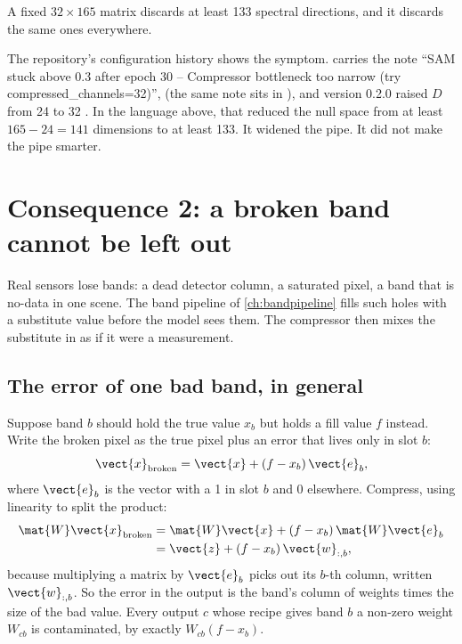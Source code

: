 \begin{keypoint}
A fixed $32\times165$ matrix discards at least 133 spectral directions, and it discards the same ones everywhere.
\end{keypoint}

{\sloppy The repository's configuration history shows the symptom.  carries the note ``SAM stuck above 0.3 after epoch 30 -- Compressor bottleneck too narrow (try compressed\_channels=32)'', (the same note sits in ), and version 0.2.0 raised $D$ from 24 to 32 . In the language above, that reduced the null space from at least $165 - 24 = 141$ dimensions to at least 133. It widened the pipe. It did not make the pipe smarter.\par}

\section{Consequence 2: a broken band cannot be left out}\label{sec:ceiling:dead}

Real sensors lose bands: a dead detector column, a saturated pixel, a band that is no-data in one scene. The band pipeline of \cref{ch:bandpipeline} fills such holes with a substitute value before the model sees them. The compressor then mixes the substitute in as if it were a measurement.

\subsection{The error of one bad band, in general}

Suppose band $b$ should hold the true value $x_b$ but holds a fill value $f$ instead. Write the broken pixel as the true pixel plus an error that lives only in slot $b$:
\begin{equation*}
  \vect{x}_{\text{broken}} = \vect{x} + (f - x_b)\,\vect{e}_b,
\end{equation*}
where $\vect{e}_b$ is the vector with a 1 in slot $b$ and 0 elsewhere. Compress, using linearity to split the product:
\begin{align}
  \mat{W}\vect{x}_{\text{broken}} &= \mat{W}\vect{x} + (f - x_b)\,\mat{W}\vect{e}_b \nonumber\\
  &= \vect{z} + (f - x_b)\,\vect{w}_{:,b}, \label{eq:ceiling:contam}
\end{align}
because multiplying a matrix by $\vect{e}_b$ picks out its $b$-th column, written $\vect{w}_{:,b}$. So the error in the output is the band's column of weights times the size of the bad value. Every output $c$ whose recipe gives band $b$ a non-zero weight $W_{cb}$ is contaminated, by exactly $W_{cb}(f - x_b)$.

